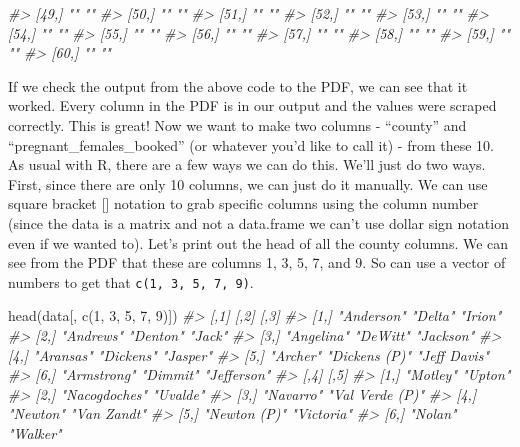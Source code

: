 \documentclass[
]{krantz}
\makeatletter
\newenvironment{Shaded}{\begin{snugshade}}{\end{snugshade}}
\newcommand{\CommentTok}[1]{\textcolor[rgb]{0.37,0.37,0.37}{\textit{#1}}}
\newcommand{\DecValTok}[1]{\textcolor[rgb]{0.06,0.06,0.06}{#1}}
\newcommand{\FunctionTok}[1]{\textcolor[rgb]{0,0,0}{#1}}
\newcommand{\NormalTok}[1]{#1}
\newenvironment{kframe}{%
\medskip{}
\setlength{\fboxsep}{.8em}
 \def\at@end@of@kframe{}%
 \ifinner\ifhmode%
  \def\at@end@of@kframe{\end{minipage}}%
  \begin{minipage}{\columnwidth}%
 \fi\fi%
 \def\FrameCommand##1{\hskip\@totalleftmargin \hskip-\fboxsep
 \colorbox{shadecolor}{##1}\hskip-\fboxsep
     \hskip-\linewidth \hskip-\@totalleftmargin \hskip\columnwidth}%
 \MakeFramed {\advance\hsize-\width
   \@totalleftmargin\z@ \linewidth\hsize
   \@setminipage}}%
 {\par\unskip\endMakeFramed%
 \at@end@of@kframe}
\renewenvironment{Shaded}{\begin{kframe}}{\end{kframe}}
\makeatother
\begin{document}
\begin{Shaded}
\begin{Highlighting}[]
\CommentTok{\#\textgreater{} [49,] ""              ""   }
\CommentTok{\#\textgreater{} [50,] ""              ""   }
\CommentTok{\#\textgreater{} [51,] ""              ""   }
\CommentTok{\#\textgreater{} [52,] ""              ""   }
\CommentTok{\#\textgreater{} [53,] ""              ""   }
\CommentTok{\#\textgreater{} [54,] ""              ""   }
\CommentTok{\#\textgreater{} [55,] ""              ""   }
\CommentTok{\#\textgreater{} [56,] ""              ""   }
\CommentTok{\#\textgreater{} [57,] ""              ""   }
\CommentTok{\#\textgreater{} [58,] ""              ""   }
\CommentTok{\#\textgreater{} [59,] ""              ""   }
\CommentTok{\#\textgreater{} [60,] ""              ""}
\end{Highlighting}
\end{Shaded}

If we check the output from the above code to the PDF, we can see that it worked. Every column in the PDF is in our output and the values were scraped correctly. This is great! Now we want to make two columns - ``county'' and ``pregnant\_females\_booked'' (or whatever you'd like to call it) - from these 10. As usual with R, there are a few ways we can do this. We'll just do two ways. First, since there are only 10 columns, we can just do it manually. We can use square bracket {[}{]} notation to grab specific columns using the column number (since the data is a matrix and not a data.frame we can't use dollar sign notation even if we wanted to). Let's print out the head of all the county columns. We can see from the PDF that these are columns 1, 3, 5, 7, and 9. So can use a vector of numbers to get that \texttt{c(1,\ 3,\ 5,\ 7,\ 9)}.

\begin{Shaded}
\begin{Highlighting}[]
\FunctionTok{head}\NormalTok{(data[, }\FunctionTok{c}\NormalTok{(}\DecValTok{1}\NormalTok{, }\DecValTok{3}\NormalTok{, }\DecValTok{5}\NormalTok{, }\DecValTok{7}\NormalTok{, }\DecValTok{9}\NormalTok{)])}
\CommentTok{\#\textgreater{}      [,1]        [,2]          [,3]        }
\CommentTok{\#\textgreater{} [1,] "Anderson"  "Delta"       "Irion"     }
\CommentTok{\#\textgreater{} [2,] "Andrews"   "Denton"      "Jack"      }
\CommentTok{\#\textgreater{} [3,] "Angelina"  "DeWitt"      "Jackson"   }
\CommentTok{\#\textgreater{} [4,] "Aransas"   "Dickens"     "Jasper"    }
\CommentTok{\#\textgreater{} [5,] "Archer"    "Dickens (P)" "Jeff Davis"}
\CommentTok{\#\textgreater{} [6,] "Armstrong" "Dimmit"      "Jefferson" }
\CommentTok{\#\textgreater{}      [,4]          [,5]           }
\CommentTok{\#\textgreater{} [1,] "Motley"      "Upton"        }
\CommentTok{\#\textgreater{} [2,] "Nacogdoches" "Uvalde"       }
\CommentTok{\#\textgreater{} [3,] "Navarro"     "Val Verde (P)"}
\CommentTok{\#\textgreater{} [4,] "Newton"      "Van Zandt"    }
\CommentTok{\#\textgreater{} [5,] "Newton (P)"  "Victoria"     }
\CommentTok{\#\textgreater{} [6,] "Nolan"       "Walker"}
\end{Highlighting}
\end{Shaded}
\end{document}

